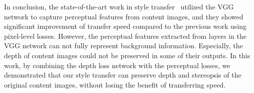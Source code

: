 \documentclass[10pt,twocolumn,letterpaper]{article}
\begin{document}
In conclusion, the state-of-the-art work in style transfer~\cite{johnson2016perceptual} utilized the VGG network to capture perceptual features from content images, and they showed significant improvement of transfer speed compared to the previous work using pixel-level losses. However, the perceptual features extracted from layers in the VGG network can not fully represent background information. Especially, the depth of content images could not be preserved in some of their outputs. In this work, by combining the depth loss network with the perceptual losses, we demonstrated that our style transfer can preserve depth and stereopsis of the original content images, without losing the benefit of transferring speed. 

{\small


}
\end{document}
